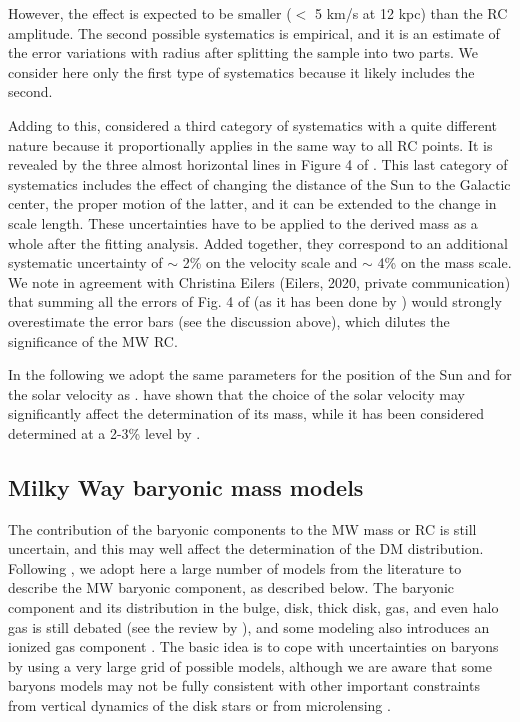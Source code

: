 \documentclass{aa}
\begin{document}
However, the effect is expected to be smaller ($<$ 5 km/s at 12 kpc) than the RC amplitude. The second possible systematics is empirical, and it is an estimate of the error variations with radius after splitting the sample into two parts. We consider here only the first type of systematics because it likely includes the second. 

Adding to this, \citet{Eilers2019} considered a third category of systematics with a quite different nature because it proportionally applies in the same way to all RC points. It is revealed by the three almost horizontal lines in Figure 4 of  \citet{Eilers2019}. This last category of systematics includes the effect of changing the distance of the Sun to the Galactic center, the proper motion of the latter, and it can be extended to the change in  scale length. These uncertainties have to be applied to the derived mass as a whole after the fitting analysis. Added together, they correspond to an additional systematic uncertainty of $\sim$ 2\% on the velocity scale and $\sim$ 4\% on the mass scale. We note in agreement with Christina Eilers (Eilers, 2020, private communication) that summing all the errors of Fig. 4 of \citet{Eilers2019} (as it has been done by \citealt{deSalas2019}) would strongly overestimate the error bars (see the discussion above), which dilutes the significance of the MW RC. %

In the following we adopt the same parameters for the position of the Sun and for the solar velocity as \citet{Eilers2019}. \citet{Karukes2020} have shown that the choice  of the solar velocity may significantly affect the determination of its mass, while it has been considered determined at a 2-3\% level by \citet{Eilers2019}.

\subsection{Milky Way baryonic mass models}
The contribution of the baryonic components to the MW mass or RC is still uncertain, and this may well affect the determination of the DM distribution. Following \citet{Karukes2020}, we adopt here a large number of  models from the literature to describe the MW baryonic component, as described below. The baryonic component and its distribution in the bulge, disk, thick disk, gas, and even halo gas is still debated (see the review by \citealt{Bland-Hawthorn2016}), and some modeling also introduces an ionized gas component \citep{Cautun2020}. The basic idea is to cope with uncertainties on baryons by using a very large grid of possible models,  although we are aware that some baryons models may not be fully consistent with other important constraints from vertical dynamics of the disk stars \citep{Bovy2013} or from microlensing \citep{Wegg2016}.  
\end{document}
